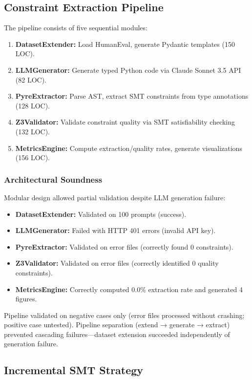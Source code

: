 \subsection{Constraint Extraction Pipeline}

The pipeline consists of five sequential modules:

\begin{enumerate}
\item \textbf{DatasetExtender:} Load HumanEval, generate Pydantic templates (150 LOC).
\item \textbf{LLMGenerator:} Generate typed Python code via Claude Sonnet 3.5 API (82 LOC).
\item \textbf{PyreExtractor:} Parse AST, extract SMT constraints from type annotations (128 LOC).
\item \textbf{Z3Validator:} Validate constraint quality via SMT satisfiability checking (132 LOC).
\item \textbf{MetricsEngine:} Compute extraction/quality rates, generate visualizations (156 LOC).
\end{enumerate}

\subsubsection{Architectural Soundness}

Modular design allowed partial validation despite LLM generation failure:
\begin{itemize}
\item \textbf{DatasetExtender:} Validated on 100 prompts (success).
\item \textbf{LLMGenerator:} Failed with HTTP 401 errors (invalid API key).
\item \textbf{PyreExtractor:} Validated on error files (correctly found 0 constraints).
\item \textbf{Z3Validator:} Validated on error files (correctly identified 0 quality constraints).
\item \textbf{MetricsEngine:} Correctly computed 0.0\% extraction rate and generated 4 figures.
\end{itemize}

Pipeline validated on negative cases only (error files processed without crashing; positive case untested). Pipeline separation (extend → generate → extract) prevented cascading failures---dataset extension succeeded independently of generation failure.

\subsection{Incremental SMT Strategy}

